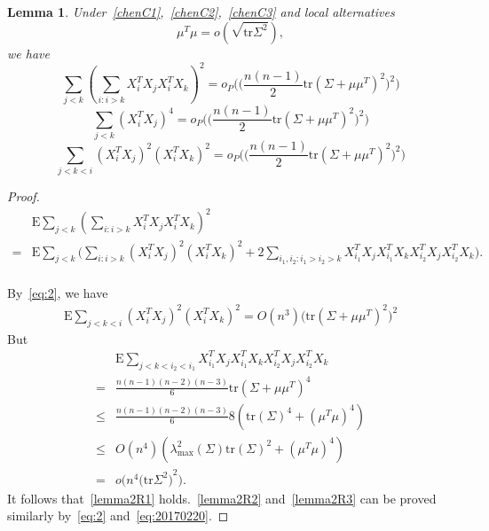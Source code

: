 \documentclass[review]{elsarticle}
\theoremstyle{plain}
\newtheorem{lemma}{Lemma}
\theoremstyle{definition}
\theoremstyle{remark}
\begin{document}
\begin{lemma}
    Under~\eqref{chenC1},~\eqref{chenC2},~\eqref{chenC3} and local alternatives
    \begin{equation} 
        \mu^T \mu=o(\sqrt{\mathrm{tr}\Sigma^2}),
    \end{equation}
we have
    \begin{equation}\label{lemma2R1}
        \sum_{j<k}{(\sum_{i:i>k}X_i^T X_j X_i^T X_k)}^2
        =o_P\Big(\big(\frac{n(n-1)}{2}\mathrm{tr}(\Sigma+\mu\mu^T)^2\big)^2\Big)
    \end{equation}
    \begin{equation}\label{lemma2R2}
        \sum_{j<k}{(X_i^T X_j)}^4=o_P\Big(\big(\frac{n(n-1)}{2}\mathrm{tr}(\Sigma+\mu\mu^T)^2\big)^2\Big)
    \end{equation}
    \begin{equation}\label{lemma2R3}
        \sum_{j<k<i}{(X_i^T X_j)}^2{(X_i^T X_k)}^2 =o_P\Big(\big(\frac{n(n-1)}{2}\mathrm{tr}(\Sigma+\mu\mu^T)^2\big)^2\Big)
    \end{equation}
\end{lemma}
\begin{proof}
    \begin{equation}
    \begin{aligned}
        &\mathrm{E}\sum_{j<k}{(\sum_{i:i>k}X_i^T X_j X_i^T X_k)}^2\\
        =&
        \mathrm{E}\sum_{j<k}\Big(\sum_{i:i>k}(X_i^T X_j)^2 (X_i^T X_k)^2+2\sum_{i_1,i_2:i_1>i_2>k}X_{i_1}^T X_j X_{i_1}^T X_k X_{i_2}^T X_j X_{i_2}^T X_k\Big).\\
    \end{aligned}
    \end{equation}

    By~\eqref{eq:2}, we have
    \begin{equation}
    \begin{aligned}
        \mathrm{E}\sum_{j<k<i}(X_i^T X_j)^2 (X_i^T X_k)^2    =O(n^3)\big(\mathrm{tr}(\Sigma+\mu\mu^T)^2\big)^2
    \end{aligned}
    \end{equation}
    But
    \begin{equation}
    \begin{aligned}
        &\mathrm{E}\sum_{j<k<i_2<i_1}X_{i_1}^T X_j X_{i_1}^T X_k X_{i_2}^T X_j X_{i_2}^T X_k\\
        =&\frac{n(n-1)(n-2)(n-3)}{6}\mathrm{tr}{(\Sigma+\mu\mu^T)}^4\\
        \leq& \frac{n(n-1)(n-2)(n-3)}{6}8(\mathrm{tr}{(\Sigma)}^4+(\mu^T \mu)^4)\\
        \leq& O(n^4)(\lambda_{\max}^2(\Sigma)\mathrm{tr}{(\Sigma)}^2+(\mu^T \mu)^4)\\
        =&
        o\Big(n^4{\big(\mathrm{tr}\Sigma^2\big)}^2\Big).
    \end{aligned}
    \end{equation}
    It follows that~\eqref{lemma2R1} holds.~\eqref{lemma2R2} and~\eqref{lemma2R3} can be proved similarly by~\eqref{eq:2} and~\eqref{eq:20170220}.

\end{proof}
\end{document}
